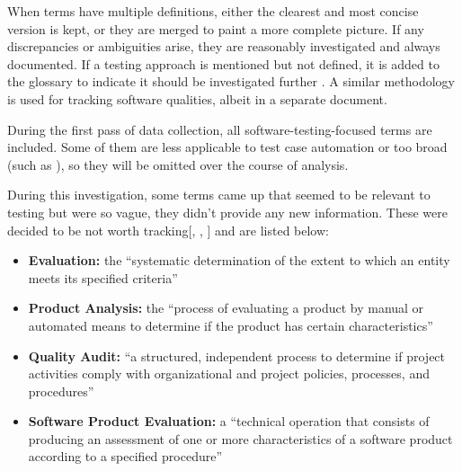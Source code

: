 When terms have multiple definitions, either the clearest and most concise
version is kept, or they are merged to paint a more complete picture.
If any discrepancies or ambiguities
arise, they are reasonably investigated and always documented. If a
testing approach is mentioned but not defined, it is added to the
glossary to indicate it should be investigated further%
. A similar methodology
is used for tracking software qualities, albeit in a separate
document.

During the first pass of data collection, all software-testing-focused terms
are included. Some of them are less applicable to test case automation
\fi or too
broad (such as \fi), so they
will be omitted over the course of analysis.

\ifnotpaper
      During this investigation, some terms came up that seemed to be relevant to
      testing but were so vague, they didn't provide any new information. These were
      decided to be not worth tracking[, ,
            ] and are listed below:

      \begin{itemize}
            \item \textbf{Evaluation:} the ``systematic determination of the extent
                  to which an entity meets its specified criteria''
                  \citep[p.~167]{IEEE2017}
            \item \textbf{Product Analysis:} the ``process of evaluating a product by
                  manual or automated means to determine if the product has certain
                  characteristics'' \citep[p.~343]{IEEE2017}
            \item \textbf{Quality Audit:} ``a structured, independent process to
                  determine if project activities comply with organizational and
                  project policies, processes, and procedures'' \citep[p.~361]{IEEE2017}
            \item \textbf{Software Product Evaluation:} a ``technical operation that
                  consists of producing an assessment of one or more characteristics
                  of a software product according to a specified procedure''
                  \citep[p.~424]{IEEE2017}
      \end{itemize}
\fi
